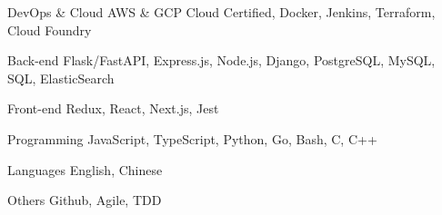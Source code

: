 

\begin{cvskills}

  \cvskill
    {DevOps \& Cloud} %
    {AWS \& GCP Cloud Certified, Docker, Jenkins, Terraform, Cloud Foundry} %

  \cvskill
    {Back-end} %
    {Flask/FastAPI, Express.js, Node.js, Django, PostgreSQL, MySQL, SQL, ElasticSearch} %

  \cvskill
    {Front-end} %
    {Redux, React, Next.js, Jest} %

  \cvskill
    {Programming} %
    {JavaScript, TypeScript, Python, Go, Bash, C, C++} %

  \cvskill
    {Languages} %
    {English, Chinese} %

  \cvskill
    {Others} %
    {Github, Agile, TDD} %


\end{cvskills}

